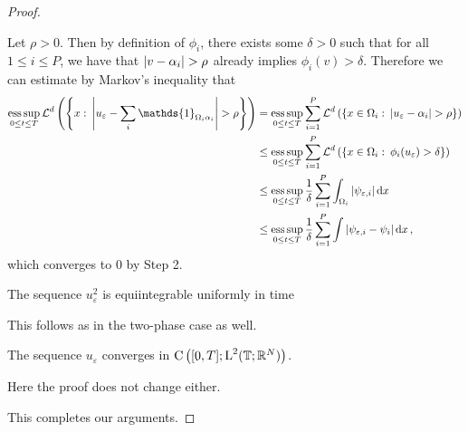 \begin{proof}
\begin{description}[wide=0pt]
		Let $ \rho > 0 $. Then by definition of $ \phi_{ i } $, there exists 
		some $ \delta > 0 $ such that for all $ 1 \leq i \leq P $, we have that 
		$ \abs{ v - \alpha_{ i } } > \rho $ already implies $ \phi_{ i } ( v ) 
		> \delta $.
		Therefore we can estimate by Markov's inequality that
		\begin{align*}
			\esssup_{ 0 \leq t \leq T }
				\lm^{ d } \left(
					\left\{
						x 
						\, \colon \,
						\abs{ u_{ \varepsilon } - \sum_{ i } \mathds{ 1 }_{ \Omega_{ i } \alpha_{ i } } } > \rho 
					\right\}
				\right)
			& = 
			\esssup_{ 0 \leq t \leq T }
				\sum_{ i = 1 }^{ P }
					\lm^{ d }
						\left(
							\left\{
								x \in \Omega_{ i }
								\, \colon \,
								\abs{ u_{ \varepsilon } - \alpha_{ i } }
								> \rho
							\right\}	
						\right)
			\\
			& \leq
				\esssup_{ 0 \leq t \leq T }
					\sum_{ i = 1 }^{ P }
						\lm^{ d } \left(
							\left\{
								x \in \Omega_{ i }
								\, \colon \,
								\phi_{ i } ( u_{ \varepsilon } ) > \delta 
							\right\}
						\right)
			\\
			& \leq
			\esssup_{ 0 \leq t \leq T }
				\frac{ 1 }{ \delta }
				\sum_{ i = 1 }^{ P }
					\int_{ \Omega_{ i } }
						\abs{ \psi_{ \varepsilon , i } }
					\dd{ x }
			\\
			& \leq
			\esssup_{ 0 \leq t \leq T }
				\frac{ 1 }{ \delta }
				\sum_{ i = 1 }^{ P }
					\int
						\abs{ \psi_{ \varepsilon,  i } - \psi_{ i } }
					\dd{ x },
		\end{align*}
		which converges to $ 0 $ by Step 2.
		
		\item[Step 4:] The sequence $ u_{ \varepsilon }^{ 2 } $ is equiintegrable uniformly in time
		
		This follows as in the two-phase case as well.
		
		\item[Step 5:] The sequence $ u_{ \varepsilon } $ converges in $ \operatorname{C} \left( [ 0 , T ] ; \operatorname{L}^{ 2 } ( \operatorname{\mathbb{T}} ; \mathbb{ R }^{ N } ) \right) $.
		
		Here the proof does not change either.
	\end{description}
	This completes our arguments.
\end{proof}


